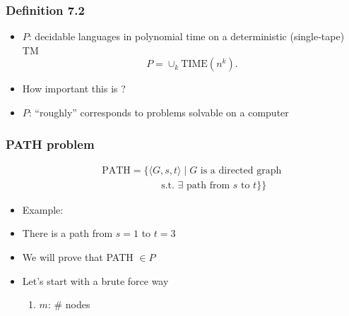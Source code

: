\begin{frame}[allowframebreaks] \frametitle{Definition 7.2}
  \begin{itemize}
\item $P$: decidable languages in polynomial time
on a deterministic (single-tape) TM
\begin{equation*}
  P=\cup_k
\text{TIME}(n^k).
\end{equation*}
\item How important this is ?

\item [] $P$: ``roughly'' corresponds to problems solvable
on a computer



\end{itemize}\end{frame} \begin{frame}[allowframebreaks] \frametitle{PATH problem}
\begin{eqnarray*}
&&  \text{PATH}
=\{
\langle  G,s,t\rangle \mid \mbox{$G$ is a directed graph}\\
&& \qquad\qquad\qquad
\mbox{s.t. $\exists$ path from $s$ to $t$}\}
\}
\end{eqnarray*}
  \begin{itemize}
  \item Example:

  \begin{center}
\end{center}
\item[] There is a path from $s=1$ to $t=3$
\item We will prove that PATH $\in P$
\item Let's start with a brute force way

  \begin{enumerate}
  \item $m$: \# nodes


\end{enumerate}
\end{itemize}
\end{frame}
